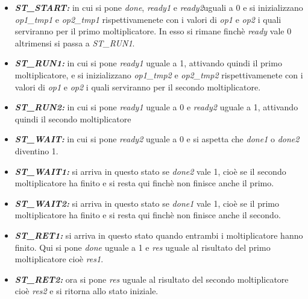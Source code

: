 \documentclass[]{IEEEtran}
\begin{document}
\begin{itemize}
\item {\it\bf ST\_START:} in cui si pone {\it done}, {\it ready1} e {\it ready2}uguali a 0 e si inizializzano {\it op1\_tmp1} e {\it op2\_tmp1} rispettivamenete con i valori di {\it op1} e {\it op2} i quali serviranno per il primo moltiplicatore. In esso si rimane finchè {\it ready} vale 0 altrimensi si passa a {\it ST\_RUN1}.
\item {\it\bf ST\_RUN1:} in cui si pone {\it ready1} uguale a 1, attivando quindi il primo moltiplicatore, e si inizializzano {\it op1\_tmp2} e {\it op2\_tmp2} rispettivamenete con i valori di {\it op1} e {\it op2} i quali serviranno per il secondo moltiplicatore.
\item {\it\bf ST\_RUN2:} in cui si pone {\it ready1} uguale a 0 e {\it ready2} uguale a 1, attivando quindi il secondo moltiplicatore
\item {\it\bf ST\_WAIT:} in cui si pone {\it ready2} uguale a 0 e si aspetta che {\it done1} o {\it done2} diventino 1.
\item {\it\bf ST\_WAIT1:} si arriva in questo stato se {\it done2} vale 1, cioè se il secondo moltiplicatore ha finito e si resta qui finchè non finisce anche il primo.
\item {\it\bf ST\_WAIT2:} si arriva in questo stato se {\it done1} vale 1, cioè se il primo moltiplicatore ha finito e si resta qui finchè non finisce anche il secondo.
\item {\it\bf ST\_RET1:} si arriva in questo stato quando entrambi i moltiplicatore hanno finito. Qui si pone {\it done} uguale a 1 e {\it res} uguale al risultato del primo moltiplicatore cioè {\it res1}.
\item {\it\bf ST\_RET2:} ora si pone {\it res} uguale al risultato del secondo moltiplicatore cioè {\it res2} e si ritorna allo stato iniziale.
\end{itemize}
\end{document}
